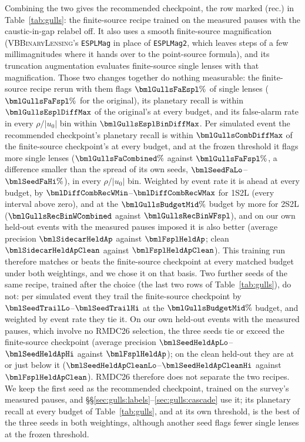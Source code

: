 Combining the two gives the recommended checkpoint, the row marked (rec.) in Table~\ref{tab:gulls}: the
finite-source recipe trained on the measured pauses with the caustic-in-gap relabel off. It also uses a
smooth finite-source magnification (\textsc{VBBinaryLensing}'s \texttt{ESPLMag} in place of
\texttt{ESPLMag2}, which leaves steps of a few millimagnitudes where it hands over to the point-source
formula), and its truncation augmentation evaluates finite-source single lenses with that magnification.
Those two changes together do nothing measurable: the finite-source recipe rerun with them flags
$\bmlGullsFaEspl\%$ of single lenses ($\bmlGullsFaFspl\%$ for the original), its planetary recall is
within $\bmlGullsEsplDiffMax$ of the original's at every budget, and its false-alarm rate in every
$\rho/|u_0|$ bin within $\bmlGullsEsplBinDiffMax$. Per simulated event the recommended checkpoint's
planetary recall is within $\bmlGullsCombDiffMax$ of the finite-source checkpoint's at every budget, and
at the frozen threshold it flags more single lenses ($\bmlGullsFaCombined\%$ against $\bmlGullsFaFspl\%$, a
difference smaller than the spread of its own seeds, $\bmlSeedFaLo$--$\bmlSeedFaHi\%$), in every $\rho/|u_0|$
bin. Weighted by event rate it is ahead at every budget, by
$\bmlDiffCombRecWMin$--$\bmlDiffCombRecWMax$ for 1S2L (every interval above zero), and at the
$\bmlGullsBudgetMid\%$ budget by more for 2S2L ($\bmlGullsRecBinWCombined$ against $\bmlGullsRecBinWFspl$), and on our own held-out events with
the measured pauses imposed it is also better (average precision $\bmlSidecarHeldAp$ against
$\bmlFsplHeldAp$; clean $\bmlSidecarHeldApClean$ against $\bmlFsplHeldApClean$). This training run
therefore matches or beats the finite-source checkpoint at every matched budget under both weightings,
and we chose it on that basis. Two further seeds of the same recipe, trained after the choice (the last
two rows of Table~\ref{tab:gulls}), do not: per simulated event they trail the finite-source checkpoint
by $\bmlSeedTrailLo$--$\bmlSeedTrailHi$ at the $\bmlGullsBudgetMid\%$ budget, and weighted by event rate
they tie it. On our own held-out events with the measured pauses, which involve no RMDC26 selection, the
three seeds tie or exceed the finite-source checkpoint (average precision
$\bmlSeedHeldApLo$--$\bmlSeedHeldApHi$ against $\bmlFsplHeldAp$); on the clean held-out they are at or just
below it ($\bmlSeedHeldApCleanLo$--$\bmlSeedHeldApCleanHi$ against $\bmlFsplHeldApClean$). RMDC26 therefore
does not separate the two recipes. We keep the first seed as the recommended checkpoint, trained on the
survey's measured pauses, and \S\S\ref{sec:gulls:labels}--\ref{sec:gulls:cascade} use it; its planetary
recall at every budget of Table~\ref{tab:gulls}, and at its own threshold, is the best of the three seeds in
both weightings, although another seed flags fewer single lenses at the frozen threshold.

